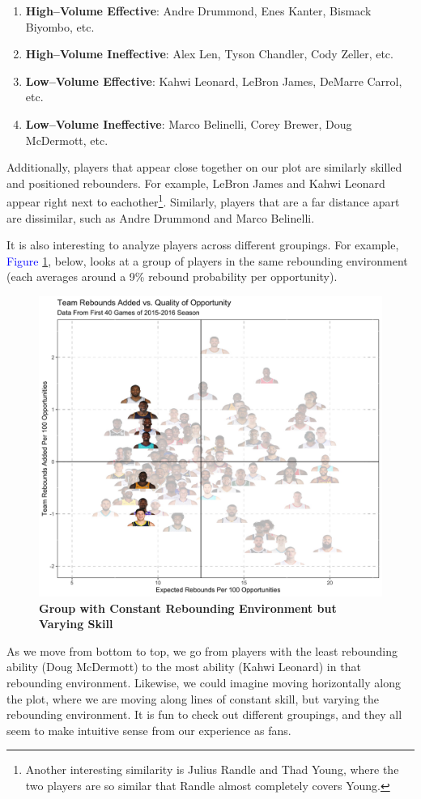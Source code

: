 \documentclass{article}
\begin{document}
\noindent
\begin{enumerate}[labelindent = 0pt]
\itemsep0em 
\item{{\bf High--Volume Effective}: Andre Drummond, Enes Kanter, Bismack Biyombo, etc.}
\item{{\bf High--Volume Ineffective}: Alex Len, Tyson Chandler, Cody Zeller, etc.}
\item{{\bf Low--Volume Effective}: Kahwi Leonard, LeBron James, DeMarre Carrol, etc.}
\item{{\bf Low--Volume Ineffective}: Marco Belinelli, Corey Brewer, Doug McDermott, etc.}
\end{enumerate}

\noindent
Additionally, players that appear close together on our plot are similarly skilled and positioned rebounders. For example, LeBron James and Kahwi Leonard appear right next to eachother\footnote{Another interesting similarity is Julius Randle and Thad Young, where the two players are so similar that Randle almost completely covers Young.}. Similarly, players that are a far distance apart are dissimilar, such as Andre Drummond and Marco Belinelli.

\bigbreak
\noindent
It is also interesting to analyze players across different groupings. For example, \textcolor{blue}{Figure} \ref{fig:PlayersPlotCstEnv}, below, looks at a group of players in the same rebounding environment (each averages around a 9\% rebound probability per opportunity).

\begin{figure}[htb]
\centering
\includegraphics[width=.85\columnwidth]{PlayersPlotCstEnv2.jpg}
\caption{\bf{Group with Constant Rebounding Environment but Varying Skill}}
\label{fig:PlayersPlotCstEnv}
\end{figure}
\clearpage
\noindent
As we move from bottom to top, we go from players with the least rebounding ability (Doug McDermott) to the most ability (Kahwi Leonard) in that rebounding environment. Likewise, we could imagine moving horizontally along the plot, where we are moving along lines of constant skill, but varying the rebounding environment. It is fun to check out different groupings, and they all seem to make intuitive sense from our experience as fans.
\end{document}
